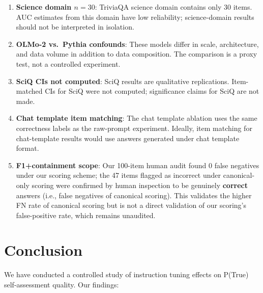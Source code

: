 \documentclass[11pt]{article}
\begin{document}
\begin{enumerate}
  \item \textbf{Science domain $n=30$}: TriviaQA science domain contains only 30 items. AUC estimates from this domain have low reliability; science-domain results should not be interpreted in isolation.
  \item \textbf{OLMo-2 vs.\ Pythia confounds}: These models differ in scale, architecture, and data volume in addition to data composition. The comparison is a proxy test, not a controlled experiment.
  \item \textbf{SciQ CIs not computed}: SciQ results are qualitative replications. Item-matched CIs for SciQ were not computed; significance claims for SciQ are not made.
  \item \textbf{Chat template item matching}: The chat template ablation uses the same correctness labels as the raw-prompt experiment. Ideally, item matching for chat-template results would use answers generated under chat template format.
  \item \textbf{F1+containment scope}: Our 100-item human audit found 0 false negatives under our scoring scheme; the 47 items flagged as incorrect under canonical-only scoring were confirmed by human inspection to be genuinely \textbf{correct} answers (i.e., false negatives of canonical scoring). This validates the higher FN rate of canonical scoring but is not a direct validation of our scoring's false-positive rate, which remains unaudited.
\end{enumerate}

\section{Conclusion}

We have conducted a controlled study of instruction tuning effects on P(True) self-assessment quality. Our findings:
\end{document}
